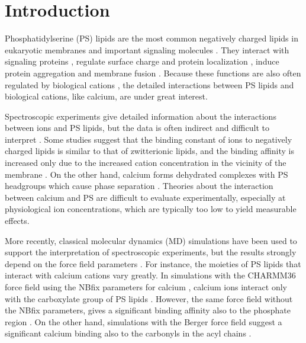\documentclass[journal=jpcbfk,manuscript=article]{achemso}
\begin{document}
 
 
\section{Introduction} 

Phosphatidylserine (PS) lipids are the most common negatively charged lipids in eukaryotic membranes
and important signaling molecules \cite{lemmon08,leventis10,li14}.
They interact with signaling proteins \cite{leventis10},
regulate surface charge and protein localization \cite{yeung08}, 
induce protein aggregation \cite{zhao04,gorbenko06} and membrane fusion \cite{??}.
Because these functions are also often regulated by biological cations \cite{leventis10},
the detailed interactions between PS lipids and biological cations, like calcium, are under great interest.

Spectroscopic experiments give detailed information about the
interactions between ions and PS lipids, but the data is often indirect and difficult to
interpret \cite{hauser77,kurland79,eisenberg79,hauser83,dluhy83,hauser85,feigenson86,mattai89,roux90,roux91}.
Some studies suggest that the
binding constant of ions to negatively charged lipids is similar to that of zwitterionic lipids,
and the binding affinity is increased only due to the increased cation
concentration in the vicinity of the membrane \cite{seelig90,sinn06}.
On the other hand, calcium forms dehydrated complexes with PS headgroups
which cause phase separation \cite{hauser77,kurland79,hauser85,feigenson86,mattai89,roux90,roux91,boettcher11}.
Theories about the interaction between calcium and PS 
are difficult to evaluate experimentally,
especially at physiological ion concentrations,
which are typically too low to yield measurable effects.

More recently, classical molecular dynamics (MD) simulations
have been used to support the interpretation of spectroscopic experiments,
but the results strongly depend on the force field parameters \cite{boettcher11,kucerka14,melcrova16,hallock18,valentine18}.
For instance, the moieties of PS lipids that interact with calcium cations vary greatly.
In simulations with the CHARMM36 force field \cite{klauda10,venable13} using the NBfix parameters for calcium \cite{kim16}, 
calcium ions interact only with the carboxylate group of PS lipids \cite{valentine18}.
However, the same force field without the NBfix parameters, gives a significant binding affinity also to the phosphate region \cite{hallock18}.
On the other hand, simulations with the Berger force field \cite{berger97,mukhopadhyay04}
suggest a significant calcium binding also to the carbonyls in the acyl chains \cite{melcrova16}.
\end{document}
